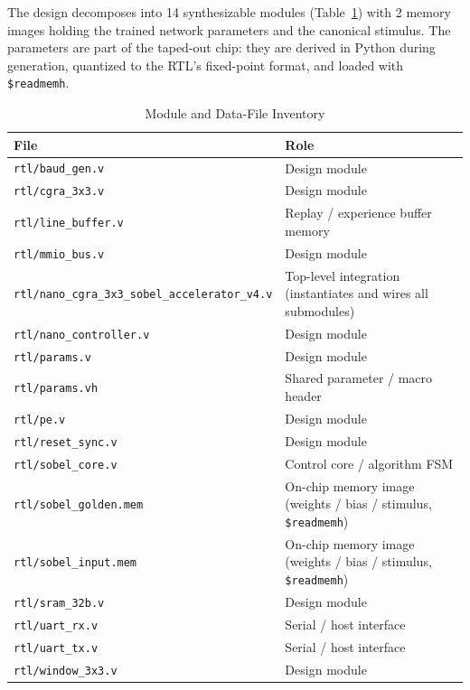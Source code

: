 \documentclass{ieeeaccess}
\begin{document}
The design decomposes into 14 synthesizable modules (Table~\ref{tab:modules}) with 2 memory images holding the trained network parameters and the canonical stimulus. The parameters are part of the taped-out chip: they are derived in Python during generation, quantized to the RTL's fixed-point format, and loaded with \texttt{\$readmemh}.

\begin{table}[!t]
\caption{Module and Data-File Inventory}
\label{tab:modules}
\setlength{\tabcolsep}{3pt}
\footnotesize
\centering
\begin{tabular}{|>{\raggedright\arraybackslash}p{}|>{\raggedright\arraybackslash}p{}|}
\hline
File & Role \\
\hline
\texttt{rtl/\allowbreak{}baud\_\allowbreak{}gen.\allowbreak{}v} & Design module \\
\texttt{rtl/\allowbreak{}cgra\_\allowbreak{}3x3.\allowbreak{}v} & Design module \\
\texttt{rtl/\allowbreak{}line\_\allowbreak{}buffer.\allowbreak{}v} & Replay / experience buffer memory \\
\texttt{rtl/\allowbreak{}mmio\_\allowbreak{}bus.\allowbreak{}v} & Design module \\
\texttt{rtl/\allowbreak{}nano\_\allowbreak{}cgra\_\allowbreak{}3x3\_\allowbreak{}sobel\_\allowbreak{}accelerator\_\allowbreak{}v4.\allowbreak{}v} & Top-level integration (instantiates and wires all submodules) \\
\texttt{rtl/\allowbreak{}nano\_\allowbreak{}controller.\allowbreak{}v} & Design module \\
\texttt{rtl/\allowbreak{}params.\allowbreak{}v} & Design module \\
\texttt{rtl/\allowbreak{}params.\allowbreak{}vh} & Shared parameter / macro header \\
\texttt{rtl/\allowbreak{}pe.\allowbreak{}v} & Design module \\
\texttt{rtl/\allowbreak{}reset\_\allowbreak{}sync.\allowbreak{}v} & Design module \\
\texttt{rtl/\allowbreak{}sobel\_\allowbreak{}core.\allowbreak{}v} & Control core / algorithm FSM \\
\texttt{rtl/\allowbreak{}sobel\_\allowbreak{}golden.\allowbreak{}mem} & On-chip memory image (weights / bias / stimulus, \texttt{\$readmemh}) \\
\texttt{rtl/\allowbreak{}sobel\_\allowbreak{}input.\allowbreak{}mem} & On-chip memory image (weights / bias / stimulus, \texttt{\$readmemh}) \\
\texttt{rtl/\allowbreak{}sram\_\allowbreak{}32b.\allowbreak{}v} & Design module \\
\texttt{rtl/\allowbreak{}uart\_\allowbreak{}rx.\allowbreak{}v} & Serial / host interface \\
\texttt{rtl/\allowbreak{}uart\_\allowbreak{}tx.\allowbreak{}v} & Serial / host interface \\
\texttt{rtl/\allowbreak{}window\_\allowbreak{}3x3.\allowbreak{}v} & Design module \\
\hline
\end{tabular}
\end{table}
\end{document}
